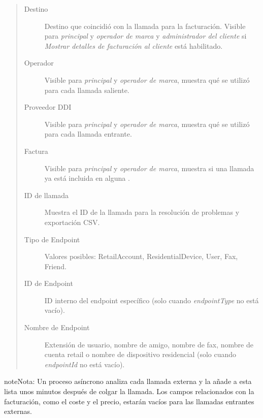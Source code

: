 \documentclass[letterpaper,10pt,spanish]{sphinxmanual}
\begin{document}
\begin{quote}
\begin{description}
\item[{Destino}] \leavevmode
Destino que coincidió con la llamada para la facturación. Visible para \emph{principal} y \emph{operador de marca} y \emph{administrador del cliente} si \emph{Mostrar detalles de facturación al cliente} está habilitado.

\item[{Operador}] \leavevmode
Visible para \emph{principal} y \emph{operador de marca}, muestra qué {\hyperref[administration_portal/brand/providers/carriers:carriers]{}} se utilizó para cada llamada saliente.

\item[{Proveedor DDI}] \leavevmode
Visible para \emph{principal} y \emph{operador de marca}, muestra qué {\hyperref[administration_portal/brand/providers/ddi_providers:ddi\string-providers]{}} se utilizó para cada llamada entrante.

\item[{Factura}] \leavevmode
Visible para \emph{principal} y \emph{operador de marca}, muestra si una llamada ya está incluida en alguna {\hyperref[administration_portal/brand/invoicing/invoices:invoices]{}}.

\item[{ID de llamada}] \leavevmode
Muestra el ID de la llamada para la resolución de problemas y exportación CSV.

\item[{Tipo de Endpoint}] \leavevmode
Valores posibles: RetailAccount, ResidentialDevice, User, Fax, Friend.

\item[{ID de Endpoint}] \leavevmode
ID interno del endpoint específico (solo cuando \emph{endpointType} no está vacío).

\item[{Nombre de Endpoint}] \leavevmode
Extensión de usuario, nombre de amigo, nombre de fax, nombre de cuenta retail o nombre de dispositivo residencial (solo cuando \emph{endpointId} no está vacío).

\end{description}
\end{quote}

\begin{notice}{note}{Nota:}
Un proceso asíncrono analiza cada llamada externa y la añade a esta lista unos minutos después de colgar la llamada. Los campos relacionados con la facturación, como el coste y el precio, estarán vacíos para las llamadas entrantes externas.
\end{notice}
\end{document}
